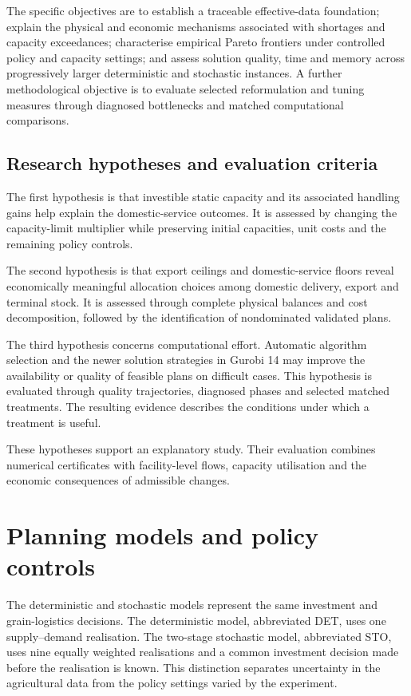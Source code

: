 \documentclass[11pt,a4paper]{article}
\begin{document}
The specific objectives are to establish a traceable effective-data foundation; explain the physical and economic mechanisms associated with shortages and capacity exceedances; characterise empirical Pareto frontiers under controlled policy and capacity settings; and assess solution quality, time and memory across progressively larger deterministic and stochastic instances. A further methodological objective is to evaluate selected reformulation and tuning measures through diagnosed bottlenecks and matched computational comparisons.

\subsection{Research hypotheses and evaluation criteria}

The first hypothesis is that investible static capacity and its associated handling gains help explain the domestic-service outcomes. It is assessed by changing the capacity-limit multiplier while preserving initial capacities, unit costs and the remaining policy controls.

The second hypothesis is that export ceilings and domestic-service floors reveal economically meaningful allocation choices among domestic delivery, export and terminal stock. It is assessed through complete physical balances and cost decomposition, followed by the identification of nondominated validated plans.

The third hypothesis concerns computational effort. Automatic algorithm selection and the newer solution strategies in Gurobi 14 may improve the availability or quality of feasible plans on difficult cases. This hypothesis is evaluated through quality trajectories, diagnosed phases and selected matched treatments. The resulting evidence describes the conditions under which a treatment is useful.

These hypotheses support an explanatory study. Their evaluation combines numerical certificates with facility-level flows, capacity utilisation and the economic consequences of admissible changes.

\section{Planning models and policy controls}
\label{sec:models}

The deterministic and stochastic models represent the same investment and grain-logistics decisions. The deterministic model, abbreviated DET, uses one supply--demand realisation. The two-stage stochastic model, abbreviated STO, uses nine equally weighted realisations and a common investment decision made before the realisation is known. This distinction separates uncertainty in the agricultural data from the policy settings varied by the experiment.
\end{document}
